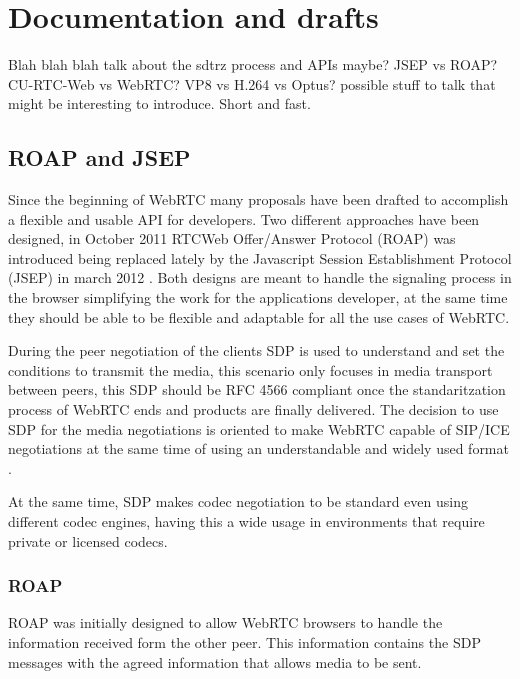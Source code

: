 \section{Documentation and drafts}

\thispagestyle{empty}

Blah blah blah talk about the sdtrz process and APIs maybe? JSEP vs ROAP? CU-RTC-Web vs WebRTC? VP8 vs H.264 vs Optus? possible stuff to talk that might be interesting to introduce. Short and fast.

\subsection{ROAP and JSEP}
Since the beginning of WebRTC many proposals have been drafted to accomplish a flexible and usable API for developers. Two different approaches have been designed, in October 2011 RTCWeb Offer/Answer Protocol (ROAP) \cite{roapIETF} was introduced being replaced lately by the Javascript Session Establishment Protocol (JSEP) in march 2012 \cite{jsepIETF}. Both designs are meant to handle the signaling process in the browser simplifying the work for the applications developer, at the same time they should be able to be flexible and adaptable for all the use cases of WebRTC. 

During the peer negotiation of the clients SDP is used to understand and set the conditions to transmit the media, this scenario only focuses in media transport between peers, this SDP should be RFC 4566 compliant once the standaritzation process of WebRTC ends and products are finally delivered. The decision to use SDP for the media negotiations is oriented to make WebRTC capable of SIP/ICE negotiations at the same time of using an understandable and widely used format \cite{alvestrandOverview2012}.  

At the same time, SDP makes codec negotiation to be standard even using different codec engines, having this a wide usage in environments that require private or licensed codecs.

\subsubsection{ROAP}
ROAP was initially designed to allow WebRTC browsers to handle the information received form the other peer. This information contains the SDP messages with the agreed information that allows media to be sent.

